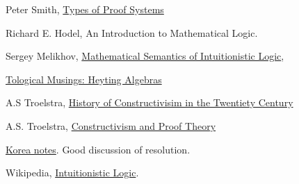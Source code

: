 \begin{thebibliography}
 Peter Smith, \href{https://www.logicmatters.net/resources/pdfs/ProofSystems.pdf}{Types of Proof Systems}

 Richard E. Hodel, An Introduction to Mathematical Logic.  

 Sergey Melikhov, \href{https://arxiv.org/pdf/1504.03380.pdf}{Mathematical Semantics of Intuitionistic Logic}, 

 \href{https://topologicalmusings.wordpress.com/2008/04/08/distributivity-topology-and-heyting-algebras/}{Tological Musings: Heyting Algebras}

 A.S Troelstra, \href{http://www.illc.uva.nl/Research/Publications/Reports/ML-1991-05.text.pdf}{History of Constructivisim in the Twentiety Century} 

 A.S. Troelstra, \href{http://citeseerx.ist.psu.edu/viewdoc/download?doi=10.1.1.10.6972&rep=rep1&type=pdf}{Constructivism and Proof Theory}

 \href{http://www1.se.cuhk.edu.hk/~seem5750/Lecture_6.pdf}{Korea notes}. Good discussion of resolution.

 Wikipedia, \href{https://en.wikipedia.org/wiki/Intuitionistic_logic}{Intuitionistic Logic}. 

\end{thebibliography}